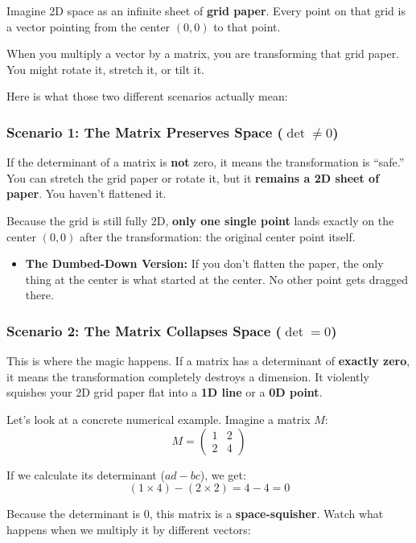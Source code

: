 \documentclass{article}
\begin{document}
Imagine 2D space as an infinite sheet of \textbf{grid paper}. Every point on that grid is a vector pointing from the center $(0,0)$ to that point. 

When you multiply a vector by a matrix, you are transforming that grid paper. You might rotate it, stretch it, or tilt it. 

Here is what those two different scenarios actually mean:

\subsubsection*{Scenario 1: The Matrix Preserves Space ($\det \neq 0$)}

If the determinant of a matrix is \textbf{not} zero, it means the transformation is ``safe.'' You can stretch the grid paper or rotate it, but it \textbf{remains a 2D sheet of paper}. You haven't flattened it.

Because the grid is still fully 2D, \textbf{only one single point} lands exactly on the center $(0,0)$ after the transformation: the original center point itself. 

\begin{itemize}
    \item \textbf{The Dumbed-Down Version:} If you don't flatten the paper, the only thing at the center is what started at the center. No other point gets dragged there. 
\end{itemize}

\subsubsection*{Scenario 2: The Matrix Collapses Space ($\det = 0$)}

This is where the magic happens. If a matrix has a determinant of \textbf{exactly zero}, it means the transformation completely destroys a dimension. It violently squishes your 2D grid paper flat into a \textbf{1D line} or a \textbf{0D point}.

Let’s look at a concrete numerical example. Imagine a matrix $M$:
\[ M = \begin{pmatrix} 1 & 2 \\ 2 & 4 \end{pmatrix} \]

If we calculate its determinant ($ad - bc$), we get: 
\[ (1 \times 4) - (2 \times 2) = 4 - 4 = 0 \]

Because the determinant is $0$, this matrix is a \textbf{space-squisher}. Watch what happens when we multiply it by different vectors:
\end{document}

